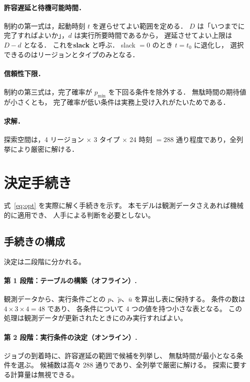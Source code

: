 \documentclass[11pt,a4paper]{ltjsreport}
\begin{document}
\paragraph{許容遅延と待機可能時間．}
制約の第一式は，起動時刻 $t$ を遅らせてよい範囲を定める．
$D$ は「いつまでに完了すればよいか」，$d$ は実行所要時間であるから，
遅延させてよい上限は $D - d$ となる．
これを\textbf{slack} と呼ぶ．
slack $= 0$ のとき $t = t_0$ に退化し，
選択できるのはリージョンとタイプのみとなる．

\paragraph{信頼性下限．}
制約の第三式は，完了確率が $p_{\min}$ を下回る条件を除外する．
無駄時間の期待値が小さくとも，
完了確率が低い条件は実務上受け入れがたいためである．

\paragraph{求解．}
探索空間は，4 リージョン $\times$ 3 タイプ $\times$ 24 時刻
$= 288$ 通り程度であり，全列挙により厳密に解ける．

\section{決定手続き}
\label{sec:procedure}

式~\eqref{eq:opt} を実際に解く手続きを示す。
本モデルは観測データさえあれば機械的に適用でき、
人手による判断を必要としない。

\subsection{手続きの構成}

決定は二段階に分かれる。

\paragraph{第 1 段階：テーブルの構築（オフライン）.}
観測データから、実行条件ごとの
$p$、$\tilde p$、$\bar u$ を算出し表に保持する。
条件の数は $4 \times 3 \times 4 = 48$ であり、
各条件について 4 つの値を持つ小さな表となる。
この処理は観測データが更新されたときにのみ実行すればよい。

\paragraph{第 2 段階：実行条件の決定（オンライン）.}
ジョブの到着時に、許容遅延の範囲で候補を列挙し、
無駄時間が最小となる条件を選ぶ。
候補数は高々 $288$ 通りであり、全列挙で厳密に解ける。
探索に要する計算量は無視できる。
\end{document}
